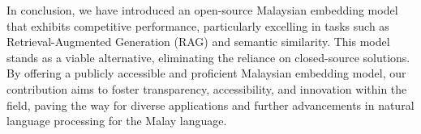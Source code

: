 \documentclass[preprint]{article}
\begin{document}
In conclusion, we have introduced an open-source Malaysian embedding model that exhibits competitive performance, particularly excelling in tasks such as Retrieval-Augmented Generation (RAG) and semantic similarity. This model stands as a viable alternative, eliminating the reliance on closed-source solutions. By offering a publicly accessible and proficient Malaysian embedding model, our contribution aims to foster transparency, accessibility, and innovation within the field, paving the way for diverse applications and further advancements in natural language processing for the Malay language.

{}

\end{document}

